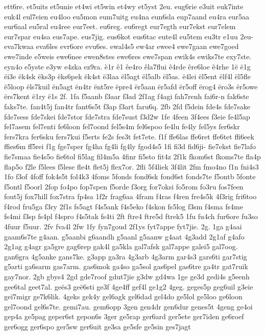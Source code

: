ett6re.
et5uits
et5unie
et4wi
et5win
et4wy
et5yst
2eu.
eug6rie
e3uit
euk7inte
euk4l
eul7eien
eu4loo
eu5mon
eum7uitg
eu4na
eun6sla
eup7aand
eu4ra
eur5aa
eur6aal
eu5ral
eu4ree
eur7eet.
eu6reg.
eu6regt
eur7egth
eur7ekst
eur7elem
eur7spar
eu4sa
eus7ape.
eus7jig.
eus6kot
eus6tac
eute4l
eu5tem
eu3tr
e1uu
2eu-
eva7kwaa
eva6les
evr6ore
evu6es.
ewal4s5
ew4ar
ewee4
ewe7gaan
ewe7goed
ewe7inde
e5weis
ewe6nee
ewen8stes
ewe6res
ewe7span
ewik4s
ewiks7te
exy7ste.
eyn4o
e5yste
e3yw
e4zka
ez9ra.
è1r
ê1
êe4ro
êla7flui
ê4rde
êre6loe
ê4rhe
1ë
ë1g
ëi3e
ëk4sk
ëks3p
ëks6pek
ëk4st
ë3laa
ël5agt
ël5alb
ël5as.
ë4lei
ël5ent
ëlf4l
ël5fle
ë5loop
ëls7kuil
ën5agt
ën4tr
ënt5re
ëpre4
ër5aan
ër5afd
ër5off
ërog4
ëro3s
ër5owe
ërs7kent
ë1ry
ë1s
2f.
1fa
f5aanb
f3aar
f3ad
2f1ag
f4agi
fah7renh
fai6r-n
fak6ste
faks7te.
fan4t5j
fan4tr
fant6s5t
f3ap
f3art
faru6q.
2fb
2fd
f5dein
fde4s
fde7sake
fde7sess
fde7skei
fde7stor
fde7stra
fde7sust
f3d2w
1fe
4feen
3f4ees
f3eie
fe4l5ap
fel7asem
fel7enti
fe6loon
fel7oond
fel5s4m
fel6spoo
fe4lu
fe4ly
fel5ys
fer6skr
fers7kra
fer6sku
fers7kui
f5erts
fe2s
fes3t
fet7ete.
f1f
ffe6las
ffe6ret
ffe6tet
ffi6eek
ffies6m
ff5rei
f1g
fge7sper
fg4ha
fg4li
fg4ly
fgod4s5
1fi
fi3d
fid6ji-
fie7ekst
fie7lafo
fie7smaa
fie4s5o
fie6tol
fi5lag
fil4m5a
4finr
fi5sto
fit4z
2f1k
fkom6st
fkoms7te
fla4p
flap5o
f2le
f5lees
f5lese
fle4t
flet5j
flex7or.
2fli
5f4liek
3f4lit
2fm
fmo4no
f1n
fni4s3
1fo
f3of
4foff
fok4s5t
fol4k3
4foms
5fonds
fond6sk
fond6st
fonds7te
f5ontb
5fonte
f5ontl
f5oorl
2fop
fo4po
fop7spen
f5orde
f3org
for7oksi
fo5rom
fo3ru
fos7feen
fout5j
fox7hill
fox7stra
fp4sa
1f2r
frag6aa
4fram
f4ras
f4ren
fre4s5k
4f3rig
fri6too
f4rod
fru5ga
f3ry
2f1s
fs5agt
f4s5ank
f4s5eko
f4skon
fs5log
f3sm
f4sma
fs4me
fs4mi
f3sp
fs4pl
f4spro
f4s5tak
fs4ti
2ft
ftre4
ftre5d
ftrek5
1fu
fu4ch
fur6ore
fu3so
4fuur
f5uur.
2fv
fva4l
2fw
1fy
fyn7goud
2f1ys
fyt7appe
fyt7jie.
2g.
1ga
g4aai
gaam6s7te
g4aan.
g5aanbi
g6aandh
g5aanl
g5aanw
g4aat
4g3add
2g1af
g4afo
2g1ag
g4agr
ga5gre
gag6rep
gak4l
ga5kla
gal7afsk
gal7appe
galei5
gal7oog.
gan6gra
4g5anke
gans7ke.
g3app
ga3ra
4g3arb
4g3arm
gar4s3
gars6ti
gar7stig
g5arti
ga6sarm
gas7arm.
gas6mok
ga4so
ga5sol
gas6pel
gas6tre
ga4tr
gat7ruik
gay7nor.
2gb
gbys4
2gd
gde7roof
gdut7jie
g3dw
gd4wa
1ge
ge3d
gedi4s
g5eenh
gee6tal
geet7al.
geës3
geë6sti
ge3f
4ge4ff
gef4l
ge1g2
4geg.
geges5p
geg6uil
g3eie
geï7migr
ge7k6lik.
4geks
gek4y
gel6agk
gel6dad
gel4do
ge5lol
ge5loo
ge6loon
gel7oond
gel6s7te.
gemi7au.
gem6opp
3gen
gen4dr
gen6dur
genes5t
4geng
ge4oi
gep4a
ge5pag
geper6st
gepon6s
3ger
ge5rap
ger6ard
ger5ete
ger7iden
ge6roef
ger6ogg
ger6spo
ger5sw
ger6uit
ge3sa
ge5sfe
ge5sin
ges7jagt
